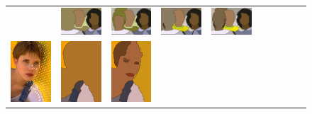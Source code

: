 \begin{figure}[tb]
\begin{center}
\begin{tabular}{cccccccccc}
&\includegraphics[width=2cm]{scale-aware/fig/visual_result/visual_result_5_4.png} \hspace{-4mm}
&\includegraphics[width=2cm]{scale-aware/fig/visual_result/visual_result_5_5.png}\hspace{-4mm}
&\includegraphics[width=2cm]{scale-aware/fig/visual_result/visual_result_5_6.png}\hspace{-4mm}
&\includegraphics[width=2cm]{scale-aware/fig/visual_result/visual_result_5_7.png}\hspace{-4mm}
\\
\hspace{-2mm}
\includegraphics[width=2cm]{scale-aware/fig/visual_result/visual_result_6_1.png}\hspace{-4mm}
&\includegraphics[width=2cm]{scale-aware/fig/visual_result/visual_result_6_2.png}\hspace{-4mm}
&\includegraphics[width=2cm]{scale-aware/fig/visual_result/visual_result_6_3.png}\hspace{-4mm}

\end{tabular}
\end{center}
\end{figure}
